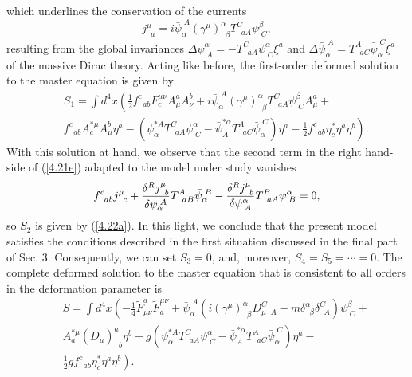 \documentclass[a4paper,12pt]{article}
\begin{document}
which underlines the conservation of the currents
\begin{equation}
j_{\;\;a}^{\mu }=
i\bar{\psi}_{\alpha }^{\;A}\left( \gamma ^{\mu }\right)
_{\;\;\beta }^{\alpha }T_{\;\;aA}^{C}
\psi _{\;C}^{\beta },  \label{5.26}
\end{equation}
resulting from the global invariances
$\Delta \psi _{\;A}^{\alpha
}=-T_{\;\;aA}^{C}\psi _{\;C}^{\alpha }
\xi ^{a}$ and $\Delta \bar{\psi}%
_{\alpha }^{\;A}=T_{\;\;aC}^{A}
\bar{\psi}_{\alpha }^{\;C}\xi ^{a}$ of the
massive Dirac theory. Acting like before,
the first-order deformed solution
to the master equation is given by
\begin{eqnarray}
&&S_{1}=\int d^{4}x\left( \frac{1}{2}
f_{\;\;ab}^{c}F_{c}^{\mu \nu }A_{\mu
}^{a}A_{\nu }^{b}+
i\bar{\psi}_{\alpha }^{\;A}\left( \gamma ^{\mu }\right)
_{\;\;\beta }^{\alpha }T_{\;\;aA}^{C}
\psi _{\;C}^{\beta }A_{\mu
}^{a}+\right. 
\nonumber \\
&&\left. f_{\;\;ab}^{c}A_{c}^{*\mu }
A_{\mu }^{b}\eta ^{a}-\left( \psi _{\alpha
}^{*A}T_{\;\;aA}^{C}\psi _{\;C}^{\alpha }-
\bar{\psi}_{A}^{*\alpha
}T_{\;\;aC}^{A}\bar{\psi}_{\alpha }^{\;C}\right)
\eta ^{a}-\frac{1}{2}%
f_{\;\;ab}^{c}\eta _{c}^{*}\eta ^{a}
\eta ^{b}\right) .  \label{5.31}
\end{eqnarray}
With this solution at hand, we observe
that the second term in the right
hand-side of (\ref{4.21e}) adapted to
the model under study vanishes
\begin{equation}
f_{\;\;ab}^{c}j_{\;\;c}^{\mu }+
\frac{\delta ^{R}j_{\;\;b}^{\mu }}{\delta
\bar{\psi}_{\alpha }^{\;A}}
T_{\;\;aB}^{A}\bar{\psi}_{\alpha }^{\;B}-\frac{%
\delta ^{R}j_{\;\;b}^{\mu }}{\delta
\psi _{\;A}^{\alpha }}T_{\;\;aA}^{B}\psi
_{\;B}^{\alpha }=0,  \label{5.31a}
\end{equation}
so $S_{2}$ is given by (\ref{4.22a}).
In this light, we conclude that the
present model satisfies the conditions
described in the first situation
discussed in the final part of Sec. 3.
Consequently, we can set $S_{3}=0$,
and, moreover, $S_{4}=S_{5}=\cdots =0$.
The complete deformed solution to
the master equation that is consistent to
all orders in the deformation
parameter is
\begin{eqnarray}
&&S=\int d^{4}x\left( -
\frac{1}{4}\tilde{F}_{\mu \nu }^{a}\tilde{F}_{a}^{\mu
\nu }+\bar{\psi}_{\alpha }^{\;A}\left( 
i\left( \gamma ^{\mu }\right)
_{\;\;\beta }^{\alpha }D_{\mu \;\;A}^{C}-
m\delta _{\;\;\beta }^{\alpha
}\delta _{\;\;A}^{C}\right) \psi _{\;C}^{\beta }+
\right.   \nonumber \\
&&A_{a}^{*\mu }\left(
D_{\mu }\right) _{\;\;b}^{a}\eta ^{b}-g\left(
\psi _{\alpha }^{*A}T_{\;\;aA}^{C}
\psi _{\;C}^{\alpha }-\bar{\psi}%
_{A}^{*\alpha }T_{\;\;aC}^{A}
\bar{\psi}_{\alpha }^{\;C}\right) \eta ^{a}-%
\nonumber \\
&&\left. \frac{1}{2}gf_{\;\;ab}^{c}
\eta _{c}^{*}\eta ^{a}\eta ^{b}\right) .
\label{5.33}
\end{eqnarray}
\end{document}

